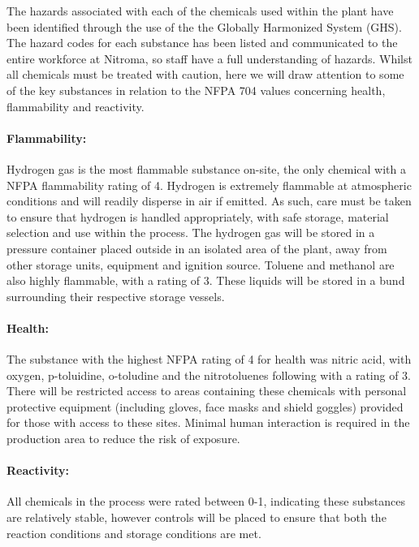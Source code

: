 The hazards associated with each of the chemicals used within the plant have been identified through the use of the the Globally Harmonized System (GHS). The hazard codes for each substance has been listed and communicated to the entire workforce at Nitroma, so staff have a full understanding of hazards. Whilst all chemicals must be treated with caution, here we will draw attention to some of the key substances in relation to the NFPA 704 values concerning health, flammability and reactivity. 

\paragraph{Flammability:}

Hydrogen gas is the most flammable substance on-site, the only chemical with a NFPA flammability rating of 4.  Hydrogen is extremely flammable at atmospheric conditions and will readily disperse in air if emitted. As such, care must be taken to ensure that hydrogen is handled appropriately, with safe storage, material selection and use within the process. The hydrogen gas will be stored in a pressure container placed outside in an isolated area of the plant, away from other storage units, equipment and ignition source.  Toluene and methanol are also highly flammable, with a rating of 3. These liquids will be stored in a bund surrounding their respective storage vessels. 


\paragraph{Health:}

The substance with the highest NFPA rating of 4 for health was nitric acid, with oxygen, p-toluidine, o-toludine and the nitrotoluenes  following with a rating of 3. There will be restricted access to areas containing these chemicals with personal protective equipment (including gloves, face masks and shield goggles) provided for those with access to these sites. Minimal human interaction is required in the production area to reduce the risk of exposure.

\paragraph{Reactivity:}

All chemicals in the process were rated between 0-1, indicating these substances are relatively stable, however controls will be placed to ensure that both the reaction conditions and storage conditions are met. 

